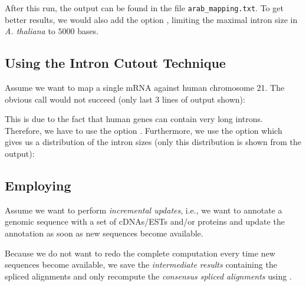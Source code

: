 \documentclass[11pt,a4paper,titlepage]{article}
\begin{document}
\begin{scriptsize}\end{scriptsize}

After this run, the output can be found in the file \texttt{arab\_mapping.txt}.
To get better results, we would also add the option , limiting the maximal intron size in \textit{A. thaliana} to $5000$
bases.

\subsection{Using the Intron Cutout Technique}
Assume we want to map a single mRNA against human chromosome 21.
The obvious call would not succeed (only last $3$ lines of output shown):

\begin{footnotesize}\end{footnotesize}

This is due to the fact that human genes can contain very long introns.
Therefore, we have to use the option .
Furthermore, we use the option  which gives us a distribution of the intron sizes (only this distribution is shown from the output):

\begin{scriptsize}\end{scriptsize}



\subsection{Employing \Callgthconsensus}
Assume we want to perform \emph{incremental updates}, i.e., we want to annotate
a genomic sequence with a set of cDNAs/ESTs and/or proteins and update the annotation as soon as new sequences become available.

Because we do not want to redo the complete computation every time new sequences become available, we save the \emph{intermediate results} containing the spliced alignments and only recompute the \emph{consensus spliced alignments} using \Callgthconsensus.
\end{document}
